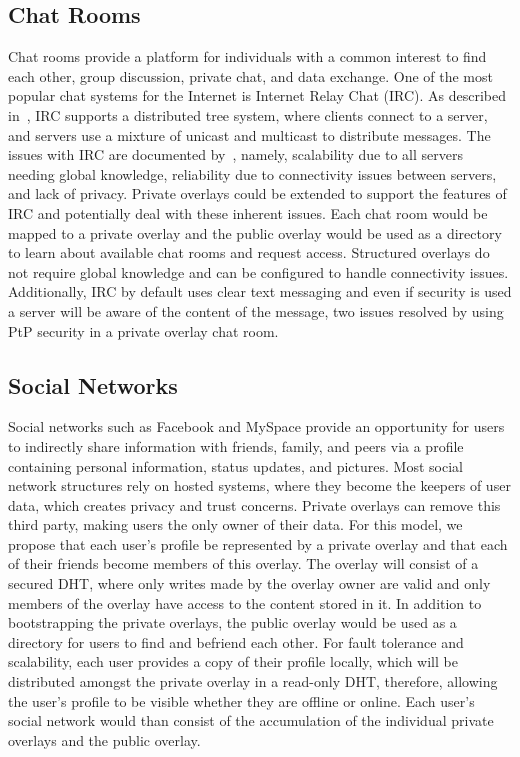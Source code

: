 \documentclass[conference]{IEEEtran}
\begin{document}
\subsection{Chat Rooms}
Chat rooms provide a platform for individuals with a common interest to find
each other, group discussion, private chat, and data exchange.  One of the most
popular chat systems for the Internet is Internet Relay Chat (IRC).  As
described in~\cite{irc}, IRC supports a distributed tree system, where clients
connect to a server, and servers use a mixture of unicast and multicast to
distribute messages.  The issues with IRC are documented by~\cite{irc_arch},
namely, scalability due to all servers needing global knowledge, reliability
due to connectivity issues between servers, and lack of privacy.  Private
overlays could be extended to support the features of IRC and potentially deal
with these inherent issues.  Each chat room would be mapped to a private
overlay and the public overlay would be used as a directory to learn about
available chat rooms and request access.  Structured overlays do not require
global knowledge and can be configured to handle connectivity issues.
Additionally, IRC by default uses clear text messaging and even if security is
used a server will be aware of the content of the message, two issues resolved
by using PtP security in a private overlay chat room.  

\subsection{Social Networks}
Social networks such as Facebook and MySpace provide an opportunity for users
to indirectly share information with friends, family, and peers via a profile
containing personal information, status updates, and pictures.  Most social
network structures rely on hosted systems, where they become the keepers of
user data, which creates privacy and trust concerns.  Private overlays can
remove this third party, making users the only owner of their data.  For this
model, we propose that each user's profile be represented by a private overlay
and that each of their friends become members of this overlay.  The overlay
will consist of a secured DHT, where only writes made by the overlay owner are
valid and only members of the overlay have access to the content stored in it.
In addition to bootstrapping the private overlays, the public overlay would be
used as a directory for users to find and befriend each other.  For fault
tolerance and scalability, each user provides a copy of their profile locally,
which will be distributed amongst the private overlay in a read-only DHT,
therefore, allowing the user's profile to be visible whether they are offline
or online.  Each user's social network would than consist of the accumulation
of the individual private overlays and the public overlay.
\end{document}
